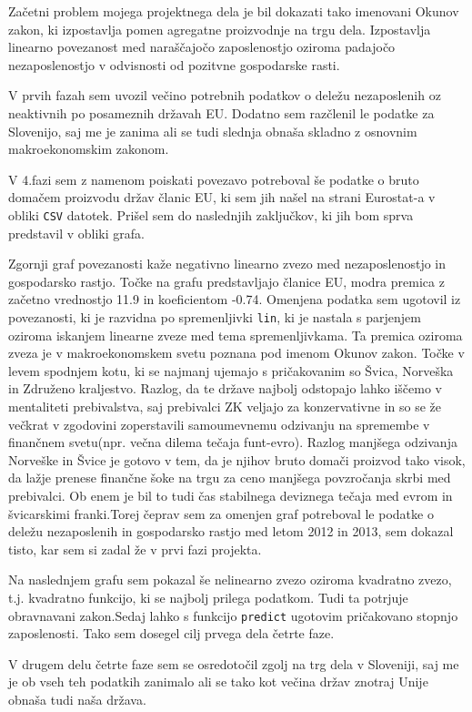 \documentclass[11pt,a4paper]{article}
\begin{document}
Začetni problem mojega projektnega dela je bil dokazati tako imenovani Okunov zakon, ki izpostavlja pomen agregatne proizvodnje na trgu dela. Izpostavlja linearno povezanost med naraščajočo zaposlenostjo oziroma padajočo nezaposlenostjo v odvisnosti od pozitvne gospodarske rasti. 

V prvih fazah sem uvozil večino potrebnih podatkov o deležu nezaposlenih oz neaktivnih po posameznih državah EU. Dodatno sem razčlenil le podatke za Slovenijo, saj me je zanima ali se tudi slednja obnaša skladno z osnovnim makroekonomskim zakonom.

V 4.fazi sem z namenom poiskati povezavo potreboval še podatke o bruto domačem proizvodu držav članic EU, ki sem jih našel na strani Eurostat-a v obliki \verb|CSV| datotek. Prišel sem do naslednjih zaključkov, ki jih bom sprva predstavil v obliki grafa.

Zgornji graf povezanosti kaže negativno linearno zvezo med nezaposlenostjo in gospodarsko rastjo. Točke na grafu predstavljajo članice EU, modra premica z začetno vrednostjo 11.9 in koeficientom -0.74. Omenjena podatka sem ugotovil iz povezanosti, ki je razvidna po spremenljivki \verb|lin|, ki je nastala s parjenjem oziroma iskanjem linearne zveze med tema spremenljivkama. Ta premica oziroma zveza je v makroekonomskem svetu poznana pod imenom Okunov zakon. Točke v levem spodnjem kotu, ki se najmanj ujemajo s pričakovanim so Švica, Norveška in Združeno kraljestvo. Razlog, da te države najbolj odstopajo lahko iščemo v mentaliteti prebivalstva, saj prebivalci ZK veljajo za konzervativne in so se že večkrat v zgodovini zoperstavili samoumevnemu odzivanju na spremembe v finančnem svetu(npr. večna dilema tečaja funt-evro). Razlog manjšega odzivanja Norveške in Švice je gotovo v tem, da je njihov bruto domači proizvod tako visok, da lažje prenese finančne šoke na trgu za ceno manjšega povzročanja skrbi med prebivalci. Ob enem je bil to tudi čas stabilnega deviznega tečaja med evrom in švicarskimi franki.Torej čeprav sem za omenjen graf potreboval le podatke o deležu nezaposlenih in gospodarsko rastjo med letom 2012 in 2013, sem dokazal tisto, kar sem si zadal že v prvi fazi projekta.

Na naslednjem grafu sem pokazal še nelinearno zvezo oziroma kvadratno zvezo, t.j. kvadratno funkcijo, ki se najbolj prilega podatkom. Tudi ta potrjuje obravnavani zakon.Sedaj lahko s funkcijo \verb|predict| ugotovim pričakovano stopnjo zaposlenosti. Tako sem dosegel cilj prvega dela četrte faze.


\pagebreak
V drugem delu četrte faze sem se osredotočil zgolj na trg dela v Sloveniji, saj me je ob vseh teh podatkih zanimalo ali se tako kot večina držav znotraj Unije obnaša tudi naša država.
\end{document}
